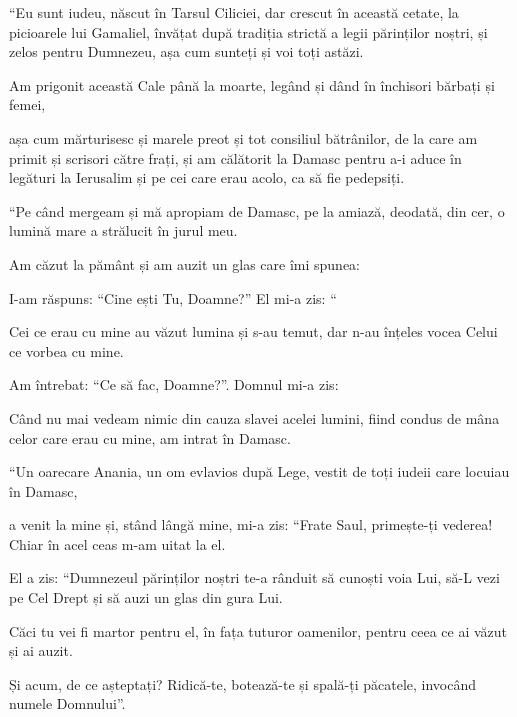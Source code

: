 {“Eu sunt iudeu, născut în Tarsul Ciliciei, dar crescut în această cetate, la picioarele lui Gamaliel, învățat după tradiția strictă a legii părinților noștri, și zelos pentru Dumnezeu, așa cum sunteți și voi toți astăzi.

Am prigonit această Cale până la moarte, legând și dând în închisori bărbați și femei,

așa cum mărturisesc și marele preot și tot consiliul bătrânilor, de la care am primit și scrisori către frați, și am călătorit la Damasc pentru a-i aduce în legături la Ierusalim și pe cei care erau acolo, ca să fie pedepsiți.


\par }{\PP {}“Pe când mergeam și mă apropiam de Damasc, pe la amiază, deodată, din cer, o lumină mare a strălucit în jurul meu.

Am căzut la pământ și am auzit un glas care îmi spunea:
{}

I-am răspuns: “Cine ești Tu, Doamne?” El mi-a zis: “{}


\par }{\PP {}Cei ce erau cu mine au văzut lumina și s-au temut, dar n-au înțeles vocea Celui ce vorbea cu mine.

Am întrebat: “Ce să fac, Doamne?”. Domnul mi-a zis:
{}

Când nu mai vedeam nimic din cauza slavei acelei lumini, fiind condus de mâna celor care erau cu mine, am intrat în Damasc.


\par }{\PP {}“Un oarecare Anania, un om evlavios după Lege, vestit de toți iudeii care locuiau în Damasc,

a venit la mine și, stând lângă mine, mi-a zis: “Frate Saul, primește-ți vederea! Chiar în acel ceas m-am uitat la el.

El a zis: “Dumnezeul părinților noștri te-a rânduit să cunoști voia Lui, să-L vezi pe Cel Drept și să auzi un glas din gura Lui.

Căci tu vei fi martor pentru el, în fața tuturor oamenilor, pentru ceea ce ai văzut și ai auzit.

Și acum, de ce așteptați? Ridică-te, botează-te și spală-ți păcatele, invocând numele Domnului”.


}
